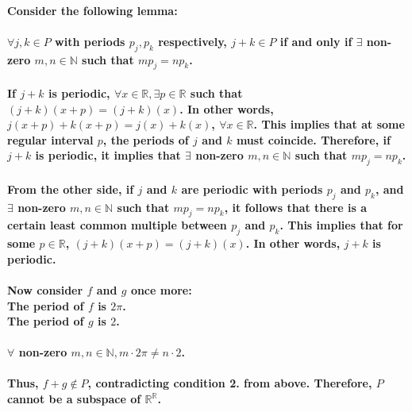 \documentclass{article}
\begin{document}
\paragraph{\large
Consider the following lemma:}

\paragraph{\large
$\forall j, k \in P$ with periods $p_j, p_k$ respectively, $j + k \in P$ if and only if $\exists$ non-zero $m,n \in \mathds{N}$ such that $mp_j = np_k$.}

\paragraph{\large
If $j + k$ is periodic, $\forall x \in \mathds{R}, \exists p \in \mathds{R}$ such that $(j + k)(x + p) = (j + k)(x)$. In other words, $j(x + p) + k(x + p) = j(x) + k(x)$, $\forall x \in \mathds{R}$. This implies that at some regular interval $p$, the periods of $j$ and $k$ must coincide. Therefore, if $j + k$ is periodic, it implies that $\exists$ non-zero $m,n \in \mathds{N}$ such that $mp_j = np_k$.}

\paragraph{\large
From the other side, if $j$ and $k$ are periodic with periods $p_{j}$ and $p_{k}$, and $\exists$ non-zero $m,n \in \mathds{N}$ such that $mp_j = np_k$, it follows that there is a certain least common multiple between $p_j$ and $p_k$. This implies that for some $p \in \mathds{R}$, $(j + k)(x + p) = (j + k)(x)$. In other words, $j + k$ is periodic.}

\paragraph{\large
Now consider $f$ and $g$ once more:
\\\indent The period of $f$ is $2\pi$.
\\\indent The period of $g$ is $2$.}

\paragraph{\large
$\forall$ non-zero $m,n \in \mathds{N}, m \cdot 2\pi \neq n \cdot 2$.
\\\\Thus, $f + g \notin P$, contradicting condition 2. from above. Therefore, $P$ cannot be a subspace of $\mathds{R}^{\mathds{R}}$.}
\end{document}
